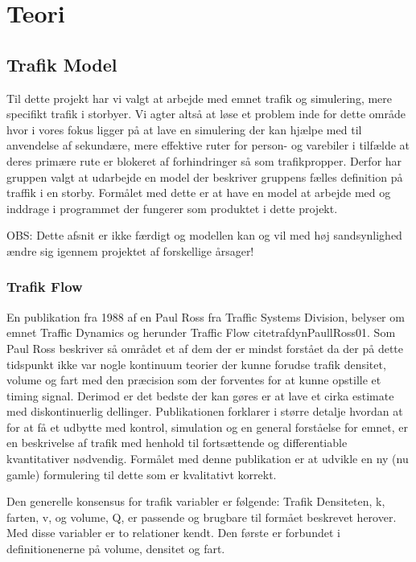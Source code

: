 \chapter{Teori}\label{Teori}

\section{Trafik Model}

Til dette projekt har vi valgt at arbejde med emnet trafik og simulering, mere specifikt trafik i storbyer. Vi agter altså at løse et problem inde for dette område hvor i vores fokus ligger på at lave en simulering der kan hjælpe med til anvendelse af sekundære, mere effektive ruter for person- og varebiler i tilfælde at deres primære rute er blokeret af forhindringer så som trafikpropper. Derfor har gruppen valgt at udarbejde en model der beskriver gruppens fælles definition på traffik i en storby. Formålet med dette er at have en model at arbejde med og inddrage i programmet der fungerer som produktet i dette projekt.

OBS: Dette afsnit er ikke færdigt og modellen kan og vil med høj sandsynlighed ændre sig igennem projektet af forskellige årsager! 

\subsection{Trafik Flow}

En publikation fra 1988 af en Paul Ross fra Traffic Systems Division, belyser om emnet Traffic Dynamics og herunder Traffic Flow cite{trafdyn}{PaullRoss01}. Som Paul Ross beskriver så området et af dem der er mindst forstået da der på dette tidspunkt ikke var nogle kontinuum teorier der kunne forudse trafik densitet, volume og fart med den præcision som der forventes for at kunne opstille et timing signal. Derimod er det bedste der kan gøres er at lave et cirka estimate med diskontinuerlig dellinger. Publikationen forklarer i større detalje hvordan at for at få et udbytte med kontrol, simulation og en general forståelse for emnet, er en beskrivelse af trafik med henhold til fortsættende og differentiable kvantitativer nødvendig. Formålet med denne publikation er at udvikle en ny (nu gamle) formulering til dette som er kvalitativt korrekt. 

Den generelle konsensus for trafik variabler er følgende: Trafik Densiteten, k, farten, v, og volume, Q, er passende og brugbare til formået beskrevet herover. Med disse variabler er to relationer kendt. Den første er forbundet i definitionenerne på volume, densitet og fart.
	
